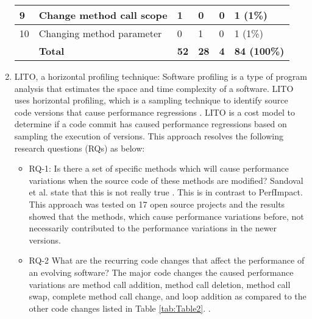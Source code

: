 \documentclass[article,type=msc,colorback,12pt,accentcolor=tud8b,table]{tudthesis}
\begin{document}
\begin{enumerate}
\begin{table}[]
\begin{tabular}{|l|l|l|l|l|l|}
		9  & Change method call scope                             & 1                                  & 0                                  & 0                                    & 1 (1\%)                                \\ \hline
		10 & Changing method parameter                            & 0                                  & 1                                  & 0                                    & 1 (1\%)                                \\ \hline
		& \textbf{Total}                                       & \textbf{52}                        & \textbf{28}                        & \textbf{4}                           & \textbf{84 (100\%)}                    \\ \hline
	\end{tabular}
\end{table}

\item{LITO, a horizontal profiling technique:} 
Software profiling is a type of program analysis that estimates the space and time complexity of a software. LITO uses horizontal profiling, which is a sampling technique to identify source code versions that cause performance regressions \cite{sandoval2016learning}. LITO is a cost model to determine if a code commit has caused performance regressions based on sampling the execution of versions. This approach resolves the following research questions (RQs) as below:

\begin{itemize}

\item RQ-1: Is there a set of specific methods which will cause performance variations when the source code of these methods are modified? Sandoval et al. state that this is not really true \cite{sandoval2016learning}. This is in contrast to PerfImpact. This approach was tested on 17 open source projects and the results showed that the methods, which cause performance variations before, not necessarily contributed to the performance variations in the newer versions.

\item RQ-2  What are the recurring code changes that affect the performance of an evolving software? The major code changes the caused performance variations are method call addition, method call deletion, method call swap, complete method call change, and loop addition  as compared to the other code changes listed in Table \ref{tab:Table2}. \cite{sandoval2016learning}.

\end{itemize}
\end{enumerate}	
\end{document}
